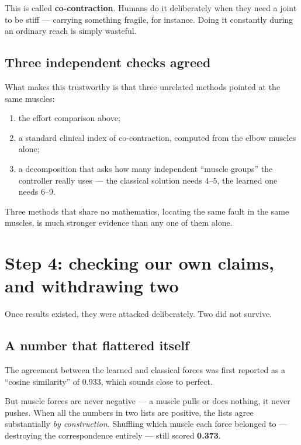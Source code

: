 \documentclass[11pt, a4paper]{article}
\begin{document}
This is called \textbf{co-contraction}. Humans do it deliberately when they need
a joint to be stiff --- carrying something fragile, for instance. Doing it
constantly during an ordinary reach is simply wasteful.

\subsection{Three independent checks agreed}

What makes this trustworthy is that three unrelated methods pointed at the same
muscles:

\begin{enumerate}[leftmargin=1.5em, itemsep=3pt]
\item the effort comparison above;
\item a standard clinical index of co-contraction, computed from the elbow
      muscles alone;
\item a decomposition that asks how many independent ``muscle groups'' the
      controller really uses --- the classical solution needs 4--5, the learned
      one needs 6--9.
\end{enumerate}

Three methods that share no mathematics, locating the same fault in the same
muscles, is much stronger evidence than any one of them alone.

\section{Step 4: checking our own claims, and withdrawing two}

Once results existed, they were attacked deliberately. Two did not survive.

\subsection{A number that flattered itself}

The agreement between the learned and classical forces was first reported as a
``cosine similarity'' of 0.933, which sounds close to perfect.

But muscle forces are never negative --- a muscle pulls or does nothing, it never
pushes. When all the numbers in two lists are positive, the lists agree
substantially \emph{by construction}. Shuffling which muscle each force belonged
to --- destroying the correspondence entirely --- still scored \textbf{0.373}.
\end{document}
